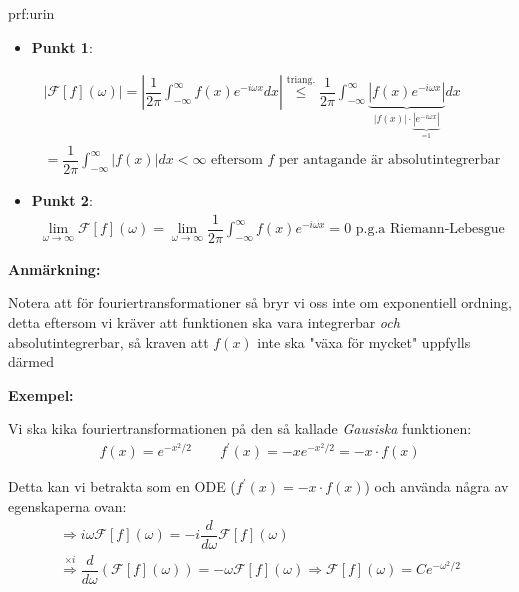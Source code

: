\begin{prf}[Punkt 1,2]{prf:urin}
  \begin{itemize}
    \item\textbf{Punkt 1}:\par
      \begin{equation*}
        \begin{gathered}
          \left|\mathcal{F}[f](\omega)\right| = \left|\dfrac{1}{2\pi}\int_{-\infty}^{\infty}f(x)e^{-i\omega x}dx\right|\stackrel{\text{triang.}}{\leq}\dfrac{1}{2\pi}\int_{-\infty}^{\infty}\underbrace{\left|f(x)e^{-i\omega x}\right|}_{\text{$\left|f(x)\right|\cdot\underbrace{\left|e^{-i\omega x}\right|}_{\text{=1}}$}}dx\\
          = \dfrac{1}{2\pi}\int_{-\infty}^{\infty}\left|f(x)\right|dx<\infty\text{ eftersom $f$ per antagande är absolutintegrerbar}
        \end{gathered}
      \end{equation*}
      \par\bigskip
    \item\textbf{Punkt 2}:
      \begin{equation*}
        \begin{gathered}
          \lim_{\omega\to\infty}\mathcal{F}[f](\omega) = \lim_{\omega\to\infty}\dfrac{1}{2\pi}\int_{-\infty}^{\infty}f(x)e^{-i\omega x} = 0\text{ p.g.a Riemann-Lebesgue}
        \end{gathered}
      \end{equation*}
  \end{itemize}
\end{prf}
\par\bigskip
\noindent\textbf{Anmärkning:}\par
\noindent Notera att för fouriertransformationer så bryr vi oss inte om exponentiell ordning, detta eftersom vi kräver att funktionen ska vara integrerbar \textit{och} absolutintegrerbar, så kraven att $f(x)$ inte ska "växa för mycket" uppfylls därmed
\par\bigskip
\noindent\textbf{Exempel:}\par
\noindent Vi ska kika fouriertransformationen på den så kallade \textit{Gausiska} funktionen:
\begin{equation*}
  \begin{gathered}
    f(x) = e^{-x^2/2}\qquad f^{\prime}(x) = -xe^{-x^2/2} = -x\cdot f(x)
  \end{gathered}
\end{equation*}
\par\bigskip
\noindent Detta kan vi betrakta som en ODE ($f^{\prime}(x) = -x\cdot f(x)$) och använda några av egenskaperna ovan: 
\begin{equation*}
  \begin{gathered}
    \Rightarrow i\omega\mathcal{F}[f](\omega) = -i\dfrac{d}{d\omega}\mathcal{F}[f](\omega)\\
    \stackrel{\times i}{\Rightarrow}\dfrac{d}{d\omega}\left(\mathcal{F}[f](\omega)\right) = -\omega\mathcal{F}[f](\omega)\Rightarrow \mathcal{F}[f](\omega) = Ce^{-\omega^2/2}
  \end{gathered}
\end{equation*}
